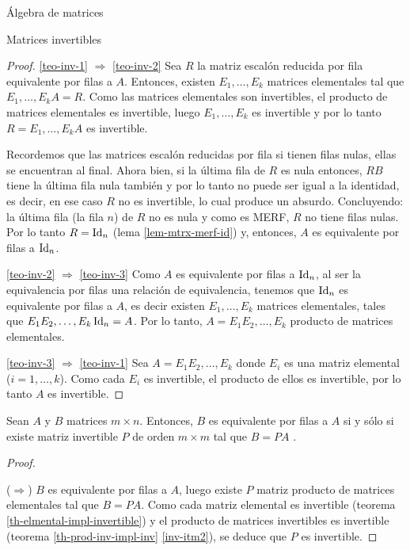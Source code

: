 \begin{chapter}{\'Algebra de matrices}
\begin{section}{Matrices invertibles}
\begin{proof}
                
                \ref{teo-inv-1} $\Rightarrow$ \ref{teo-inv-2}\; Sea $R$ la matriz escalón reducida por fila equivalente por filas a $A$. Entonces,  existen $E_1,\ldots,E_k$ matrices elementales tal que $E_1,\ldots,E_kA = R$. Como las matrices elementales son invertibles, el producto de matrices elementales es invertible, luego  $E_1,\ldots,E_k$ es invertible y por lo tanto $R=E_1,\ldots,E_kA$ es invertible. 
                
                Recordemos que las matrices escalón reducidas por fila si tienen filas nulas, ellas se encuentran al final.  Ahora bien,  si la última fila de $R$ es nula entonces,  $RB$ tiene la última fila nula también y por lo tanto no puede ser igual a la identidad, es decir, en ese caso $R$ no es invertible, lo cual produce un absurdo. Concluyendo: la última fila (la fila $n$) de $R$ no es nula y como es MERF, $R$ no tiene filas nulas. Por lo tanto $R=\operatorname{Id}_n$ (lema \ref{lem-mtrx-merf-id}) y,  entonces, $A$ es equivalente por filas a $\operatorname{Id}_n$. 
                
                \ref{teo-inv-2} $\Rightarrow$ \ref{teo-inv-3}\; Como $A$  es equivalente por filas a $\operatorname{Id}_n$, al ser la equivalencia por filas una relación de equivalencia,  tenemos que $\operatorname{Id}_n$ es equivalente por filas a $A$, es decir  existen $E_1,\ldots,E_k$ matrices elementales, tales que $E_1E_2,\ldots,E_k\operatorname{Id}_n = A$. Por lo tanto, $A =E_1E_2,\ldots,E_k$ producto de matrices elementales.
                
                \ref{teo-inv-3} $\Rightarrow$ \ref{teo-inv-1} \; Sea $A = E_1E_2,\ldots,E_k$ donde $E_i$  es una matriz elemental ($i=1,\ldots,k$). Como cada $E_i$ es invertible,  el producto de ellos es invertible,  por lo tanto $A$ es invertible.
            \end{proof}    
            
            \begin{corolario}
                Sean $A$ y $B$ matrices $m \times n$. Entonces,   $B$ es equivalente por filas a $A$ si y sólo si existe matriz invertible $P$ de orden $m \times m$ tal que $B =PA$ . 
            \end{corolario}
            \begin{proof}
                
                \
                
                ($\Rightarrow$) $B$ es equivalente por filas a $A$,  luego existe $P$ matriz producto de matrices elementales tal que $B =PA$. Como cada matriz elemental es invertible (teorema \ref{th-elmental-impl-invertible}) y el producto de matrices invertibles es invertible (teorema  \ref{th-prod-inv-impl-inv} \ref{inv-itm2}), se deduce que $P$ es invertible. 
                

\end{proof}
\end{section}
\end{chapter}
